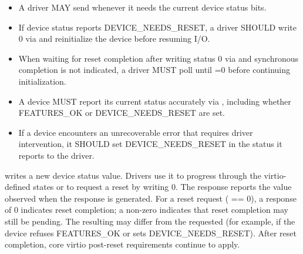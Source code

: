 \begin{itemize}
  \item A driver MAY send  whenever it needs the
        current device status bits.
  \item If device status reports DEVICE\_NEEDS\_RESET, a driver SHOULD write 0
        via  and reinitialize the device before
        resuming I/O.
  \item When waiting for reset completion after writing status 0 via
         and synchronous completion is not indicated,
        a driver MUST poll  until
        =0 before continuing initialization.
\end{itemize}

\begin{itemize}
  \item A device MUST report its current status accurately via
        , including whether FEATURES\_OK or
        DEVICE\_NEEDS\_RESET are set.
  \item If a device encounters an unrecoverable error that requires driver
        intervention, it SHOULD set DEVICE\_NEEDS\_RESET in the status it
        reports to the driver.
\end{itemize}


 writes a new device status value. Drivers use it to
progress through the virtio-defined states or to request a reset by writing 0.
The response reports the  value observed when the response is
generated. For a reset request ( == 0), a response
 of 0 indicates reset completion; a non-zero 
indicates that reset completion may still be pending. The resulting
 may differ from the requested  (for example, if
the device refuses FEATURES\_OK or sets DEVICE\_NEEDS\_RESET). After reset
completion, core virtio post-reset requirements continue to apply.

